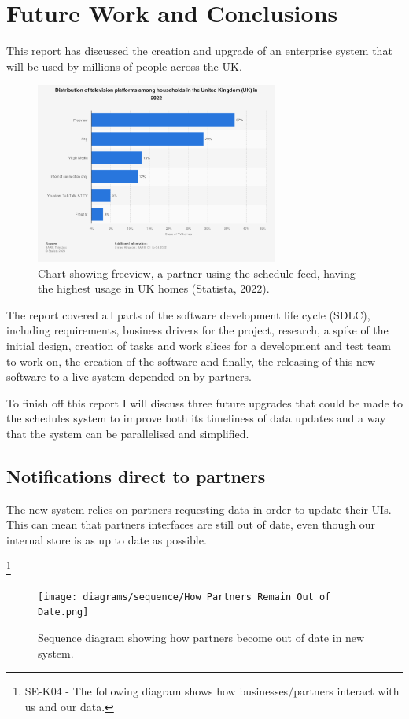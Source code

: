 \section{Future Work and Conclusions}
\label{sec:future}
This report has discussed the creation and upgrade of an enterprise system that will be used by millions of people across the UK.

\begin{figure}[H]
  \centering
  \includegraphics[width=8cm]{assets/tvPlatformChart.png}
  \caption{Chart showing freeview, a partner using the schedule feed, having the highest usage in UK homes (Statista, 2022).}
  \label{fig:tvPlatformChart}
\end{figure}

The report covered all parts of the software development life cycle (SDLC), including requirements, business drivers for the project, research,
a spike of the initial design, creation of tasks and work slices for a development and test team to work on, the creation of the software and
finally, the releasing of this new software to a live system depended on by partners.

To finish off this report I will discuss three future upgrades that could be made to the schedules system to improve both its timeliness of data updates
and a way that the system can be parallelised and simplified.

\newpage
\subsection{Notifications direct to partners}
The new system relies on partners requesting data in order to update their UIs. This can mean that partners interfaces are still out of date, even 
though our internal store is as up to date as possible.

\footnote{SE-K04 - The following diagram shows how businesses/partners interact with us and our data.}
\begin{figure}[H]
  \centering
  \texttt{[image: diagrams/sequence/How Partners Remain Out of Date.png]}
  \caption{Sequence diagram showing how partners become out of date in new system.}
  \label{fig:sequenceOutOfDate}
\end{figure}

